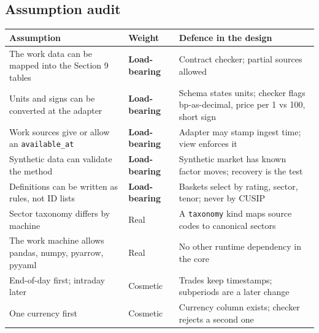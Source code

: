 \documentclass[11pt,a4paper]{article}
\newcommand{\code}[1]{\texttt{\small #1}}
\begin{document}
\subsection{Assumption audit}
\begin{center}\small
\begin{tabularx}{\linewidth}{@{}Xll@{}}\toprule
Assumption & Weight & Defence in the design \\\midrule
The work data can be mapped into the Section 9 tables & \textbf{Load-bearing} & Contract checker; partial sources allowed \\
Units and signs can be converted at the adapter & \textbf{Load-bearing} & Schema states units; checker flags bp-as-decimal, price per 1 vs 100, short sign \\
Work sources give or allow an \code{available\_at} & \textbf{Load-bearing} & Adapter may stamp ingest time; view enforces it \\
Synthetic data can validate the method & \textbf{Load-bearing} & Synthetic market has known factor moves; recovery is the test \\
Definitions can be written as rules, not ID lists & \textbf{Load-bearing} & Baskets select by rating, sector, tenor; never by CUSIP \\
Sector taxonomy differs by machine & Real & A \code{taxonomy} kind maps source codes to canonical sectors \\
The work machine allows pandas, numpy, pyarrow, pyyaml & Real & No other runtime dependency in the core \\
End-of-day first; intraday later & Cosmetic & Trades keep timestamps; subperiods are a later change \\
One currency first & Cosmetic & Currency column exists; checker rejects a second one \\\bottomrule
\end{tabularx}
\end{center}
\end{document}
